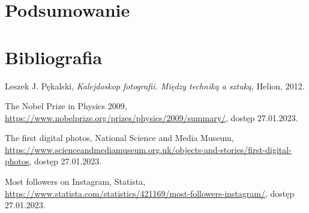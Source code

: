 \documentclass[12pt]{article}
\numberwithin{figure}{section}
\begin{document}
\begin{sloppypar}

\newpage 

\section{Podsumowanie}


\newpage 

%
    \listoffigures
    \clearpage


\newpage 

%
    \listoftables
    \clearpage


\newpage 

%
    \listofcodes
    \clearpage


\newpage 

\section*{Bibliografia}
    \renewcommand{\section}[2]{}
    
\begin{thebibliography}{99}

    Leszek J. Pękalski,
    \textit{Kalejdoskop fotografii. Między techniką a sztuką},
    Helion,
    2012.

    The Nobel Prize in Physics 2009,
    \url{https://www.nobelprize.org/prizes/physics/2009/summary/}, 
    dostęp 27.01.2023.

    The first digital photos, National Science and Media Museum,
    \url{https://www.scienceandmediamuseum.org.uk/objects-and-stories/first-digital-photos},
    dostęp 27.01.2023.

    Most followers on Instagram, Statista,
    \url{https://www.statista.com/statistics/421169/most-followers-instagram/},
    dostęp 27.01.2023.


\end{thebibliography}
\end{sloppypar}
\end{document}
